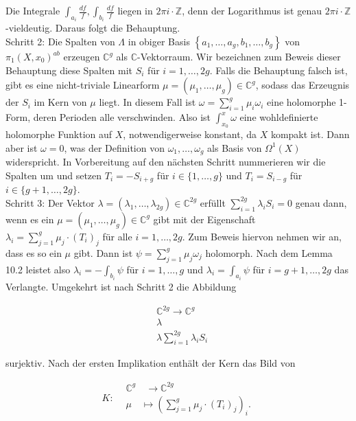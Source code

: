 \documentclass[10pt, letterpaper]{article}
\begin{document}
Die Integrale $\int_{a_{i}} \frac{d f}{f}, \int_{b_{i}} \frac{d f}{f}$ liegen in $2 \pi i \cdot \mathbb{Z}$, denn der Logarithmus ist genau $2 \pi i \cdot \mathbb{Z}$-vieldeutig. Daraus folgt die Behauptung.\\
Schritt 2: Die Spalten von $\Lambda$ in obiger Basis $\left\{a_{1}, \ldots, a_{g}, b_{1}, \ldots, b_{g}\right\}$ von $\pi_{1}\left(X, x_{0}\right)^{a b}$ erzeugen $\mathbb{C}^{g}$ als $\mathbb{C}$-Vektorraum. Wir bezeichnen zum Beweis dieser Behauptung diese Spalten mit $S_{i}$ für $i=1, \ldots, 2 g$. Falls die Behauptung falsch ist, gibt es eine nicht-triviale Linearform $\mu=\left(\mu_{1}, \ldots, \mu_{g}\right) \in \mathbb{C}^{g}$, sodass das Erzeugnis der $S_{i}$ im Kern von $\mu$ liegt. In diesem Fall ist $\omega=\sum_{i=1}^{g} \mu_{i} \omega_{i}$ eine holomorphe 1-Form, deren Perioden alle verschwinden. Also ist $\int_{x_{0}}^{x} \omega$ eine wohldefinierte holomorphe Funktion auf $X$, notwendigerweise konstant, da $X$ kompakt ist. Dann aber ist $\omega=0$, was der Definition von $\omega_{1}, \ldots, \omega_{g}$ als Basis von $\Omega^{1}(X)$ widerspricht. In Vorbereitung auf den nächsten Schritt nummerieren wir die Spalten um und setzen $T_{i}=-S_{i+g}$ für $i \in\{1, \ldots, g\}$ und $T_{i}=S_{i-g}$ für $i \in\{g+1, \ldots, 2 g\}$.\\
Schritt 3: Der Vektor $\lambda=\left(\lambda_{1}, \ldots, \lambda_{2 g}\right) \in \mathbb{C}^{2 g}$ erfüllt $\sum_{i=1}^{2 g} \lambda_{i} S_{i}=0$ genau dann, wenn es ein $\mu=\left(\mu_{1}, \ldots, \mu_{g}\right) \in \mathbb{C}^{g}$ gibt mit der Eigenschaft $\lambda_{i}=\sum_{j=1}^{g} \mu_{j} \cdot\left(T_{i}\right)_{j}$ für alle $i=1, \ldots, 2 g$. Zum Beweis hiervon nehmen wir an, dass es so ein $\mu$ gibt. Dann ist $\psi=\sum_{j=1}^{g} \mu_{j} \omega_{j}$ holomorph. Nach dem Lemma 10.2 leistet also $\lambda_{i}=-\int_{b_{i}} \psi$ für $i=1, \ldots, g$ und $\lambda_{i}=\int_{a_{i}} \psi$ für $i=g+1, \ldots, 2 g$ das Verlangte. Umgekehrt ist nach Schritt 2 die Abbildung

$$
\begin{aligned}
& \mathbb{C}^{2 g} \longrightarrow \mathbb{C}^{g} \\
& \lambda \\
& \lambda \sum_{i=1}^{2 g} \lambda_{i} S_{i}
\end{aligned}
$$

surjektiv. Nach der ersten Implikation enthält der Kern das Bild von

$$
K: \begin{aligned}
& \mathbb{C}^{g} \quad \longrightarrow \mathbb{C}^{2 g} \\
& \mu \quad \longmapsto\left(\sum_{j=1}^{g} \mu_{j} \cdot\left(T_{i}\right)_{j}\right)_{i} .
\end{aligned}
$$
\end{document}
